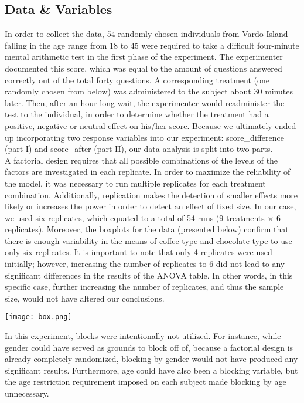 \documentclass[12pt]{article}
\begin{document}
\begin{flushleft}
\section{Data \& Variables}
\bigskip
In order to collect the data, 54 randomly chosen individuals from Vardo Island falling in the age range from 18 to 45 were required to take a difficult four-minute mental arithmetic test in the first phase of the experiment. The experimenter documented this score, which was equal to the amount of questions answered correctly out of the total forty questions. A corresponding treatment (one randomly chosen from below) was administered to the subject about 30 minutes later. Then, after an hour-long wait, the experimenter would readminister the test to the individual, in order to determine whether the treatment had a positive, negative or neutral effect on his/her score. Because we ultimately ended up incorporating two response variables into our experiment: score\_difference (part I) and score\_after (part II), our data analysis is split into two parts. 
\bigskip
\\A factorial design requires that all possible combinations of the levels of the factors are investigated in each replicate. In order to maximize the reliability of the model, it was necessary to run multiple replicates for each treatment combination. Additionally, replication makes the detection of smaller effects more likely or increases the power in order to detect an effect of fixed size. In our case, we used six replicates, which equated to a total of 54 runs (9 treatments $\times$ 6 replicates). Moreover, the boxplots for the data (presented below) confirm that there is enough variability in the means of coffee type and chocolate type to use only six replicates. It is important to note that only 4 replicates were used initially; however, increasing the number of replicates to 6 did not lead to any significant differences in the results of the ANOVA table. In other words, in this specific case, further increasing the number of replicates, and thus the sample size, would not have altered our conclusions. 
\begin{center}
\texttt{[image: box.png]}
\end{center}
In this experiment, blocks were intentionally not utilized. For instance, while gender could have served as grounds to block off of, because a factorial design is already completely randomized, blocking by gender would not have produced any significant results. Furthermore, age could have also been a blocking variable, but the age restriction requirement imposed on each subject made blocking by age unnecessary. 

\end{flushleft}
\end{document}
